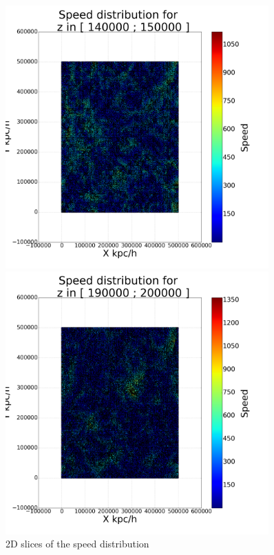 \documentclass[12pt]{article}
\begin{document}
\begin{figure}[ht]
\begin{minipage}{.45\textwidth}
\end{minipage}
\begin{minipage}{.45\textwidth}
  \centering
  \includegraphics[width=0.9\textwidth]{graphs/scatter_magnitud_vel150000.png}
\end{minipage}
\begin{minipage}{.45\textwidth}
  \centering
  \includegraphics[width=0.9\textwidth]{graphs/scatter_magnitud_vel200000.png}
\end{minipage}
\caption{2D slices of the speed distribution}\label{fig:2D_slices}
\end{figure}
\FloatBarrier
\end{document}
